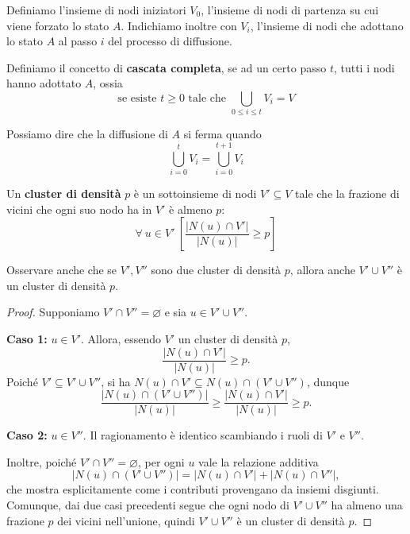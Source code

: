 \begin{definizione}
    Definiamo l'insieme di nodi iniziatori $V_0$, l'insieme di nodi di partenza su cui viene forzato lo stato $A$. Indichiamo inoltre con $V_i$, l'insieme di nodi che adottano lo stato $A$ al passo $i$ del processo di diffusione.
\end{definizione}

\begin{definizione}
    Definiamo il concetto di \textbf{cascata completa}, se ad un certo passo $t$, tutti i nodi hanno adottato $A$, ossia
    \[
    \text{se esiste } t \geq 0 \text{ tale che } \bigcup_{0 \leq i \leq t}V_i = V 
    \]

    Possiamo dire che la diffusione di $A$ si ferma quando 
    \[
    \bigcup_{i = 0}^{t} V_i = \bigcup_{i = 0}^{t+1} V_i
    \]
\end{definizione}

\begin{definizione}
    Un \textbf{cluster di densità} $p$ è un sottoinsieme di nodi $V' \subseteq V$ tale che la frazione di vicini che ogni suo nodo ha in $V'$ è almeno $p$:
    \[
    \forall\ u \in V'\ \left[\frac{|N(u) \cap V'|}{|N(u)|} \geq p\right]
    \]
\end{definizione}

\begin{osservazione}
    Osservare anche che se $V',V''$ sono due cluster di densità $p$, allora anche $V' \cup V''$ è un cluster di densità $p$.
\end{osservazione}

\begin{proof}
Supponiamo $V'\cap V''=\varnothing$ e sia $u\in V'\cup V''$.

\textbf{Caso 1:} $u\in V'$. Allora, essendo $V'$ un cluster di densità $p$,
\[
\frac{|N(u)\cap V'|}{|N(u)|}\ge p.
\]
Poiché $V'\subseteq V'\cup V''$, si ha $N(u)\cap V'\subseteq N(u)\cap (V'\cup V'')$, dunque
\[
\frac{|N(u)\cap (V'\cup V'')|}{|N(u)|}\ge\frac{|N(u)\cap V'|}{|N(u)|}\ge p.
\]

\textbf{Caso 2:} $u\in V''$. Il ragionamento è identico scambiando i ruoli di $V'$ e $V''$.

Inoltre, poiché $V'\cap V''=\varnothing$, per ogni $u$ vale la relazione additiva
\[
|N(u)\cap (V'\cup V'')|=|N(u)\cap V'|+|N(u)\cap V''|,
\]
che mostra esplicitamente come i contributi provengano da insiemi disgiunti. Comunque, dai due casi precedenti segue che ogni nodo di $V'\cup V''$ ha almeno una frazione $p$ dei vicini nell'unione, quindi $V'\cup V''$ è un cluster di densità $p$.
\end{proof}

